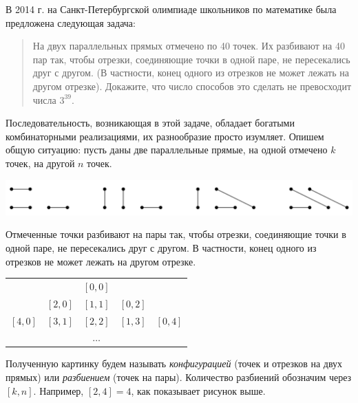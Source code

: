 \documentclass[10pt]{scrbook} \usepackage{modules/nonstahp_book}
\begin{document}







В 2014 г. на Санкт-Петербургской олимпиаде школьников по математике была предложена следующая задача:
\begin{quote}
На двух параллельных прямых отмечено по 40 точек. Их разбивают на 40 пар так, чтобы отрезки, соединяющие точки в одной паре, не пересекались друг с другом. (В частности, конец одного из отрезков не может лежать на другом отрезке). Докажите, что число способов это сделать не превосходит числа $3^{39}$.
\end{quote}
Последовательность, возникающая в этой задаче, обладает богатыми комбинаторными реализациями, их разнообразие просто изумляет. Опишем общую ситуацию: пусть даны две параллельные прямые, на одной отмечено $k$ точек, на другой $n$ точек. 
\begin{center}
\includegraphics[width=1\linewidth]{Pairs.png}%
\end{center}
Отмеченные точки разбивают на пары так, чтобы отрезки, соединяющие точки в одной паре, не пересекались друг с другом. В частности, конец одного из отрезков не может лежать на другом отрезке. 
\begin{center}
\begin{tabular}{c c c c c}
       &       &$[0,0]$&       &     \\
       &$[2,0]$&$[1,1]$&$[0,2]$&     \\
$[4,0]$&$[3,1]$&$[2,2]$&$[1,3]$&$[0,4]$ \\
       &       &$\ldots$&      &
\end{tabular}
\end{center}
Полученную картинку будем называть {\itshape конфигурацией} (точек и отрезков на двух прямых) или {\itshape разбиением} (точек на пары). Количество разбиений обозначим через $[k,n]$. Например, $[2,4] = 4$, как показывает рисунок выше.
\end{document}

